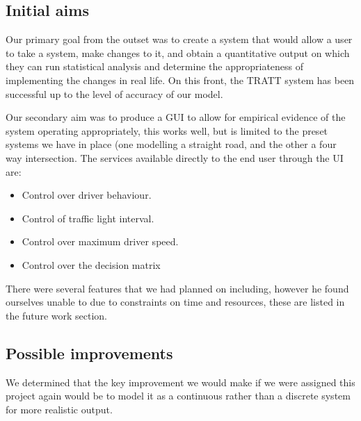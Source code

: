 	\subsection{Initial aims}
    	Our primary goal from the outset was to create a system that would allow a user to take a system, make changes to it, and obtain a quantitative output on which they can run statistical analysis and determine the appropriateness of implementing the changes in real life. On this front, the TRATT system has been successful up to the level of accuracy of our model.
        
        Our secondary aim was to produce a GUI to allow for empirical evidence of the system operating appropriately, this works well, but is limited to the preset systems we have in place (one modelling a straight road, and the other a four way intersection. The services available directly to the end user through the UI are:
        \begin{itemize}
        	\item Control over driver behaviour.
            \item Control of traffic light interval.
            \item Control over maximum driver speed.
            \item Control over the decision matrix
        \end{itemize}

	There were several features that we had planned on including, however he found ourselves unable to due to constraints on time and resources, these are listed in the future work section.
    
	\subsection{Possible improvements}
    	We determined that the key improvement we would make if we were assigned this project again would be to model it as a continuous rather than a discrete system for more realistic output.
        
